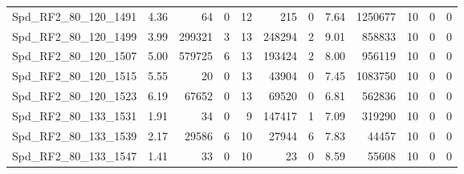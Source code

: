 \begin{longtable}[c]{@{}lrrrrrrrrrrr@{}}
Spd\_RF2\_80\_120\_1491       & 4.36                   & 64                      & 0                       & 12                     & 215                     & 0                       & 7.64                    & 1250677                  & 10                       & 0                        & 0                        \\
Spd\_RF2\_80\_120\_1499       & 3.99                   & 299321                  & 3                       & 13                     & 248294                  & 2                       & 9.01                    & 858833                   & 10                       & 0                        & 0                        \\
Spd\_RF2\_80\_120\_1507       & 5.00                   & 579725                  & 6                       & 13                     & 193424                  & 2                       & 8.00                    & 956119                   & 10                       & 0                        & 0                        \\
Spd\_RF2\_80\_120\_1515       & 5.55                   & 20                      & 0                       & 13                     & 43904                   & 0                       & 7.45                    & 1083750                  & 10                       & 0                        & 0                        \\
Spd\_RF2\_80\_120\_1523       & 6.19                   & 67652                   & 0                       & 13                     & 69520                   & 0                       & 6.81                    & 562836                   & 10                       & 0                        & 0                        \\
Spd\_RF2\_80\_133\_1531       & 1.91                   & 34                      & 0                       & 9                      & 147417                  & 1                       & 7.09                    & 319290                   & 10                       & 0                        & 0                        \\
Spd\_RF2\_80\_133\_1539       & 2.17                   & 29586                   & 6                       & 10                     & 27944                   & 6                       & 7.83                    & 44457                    & 10                       & 0                        & 0                        \\
Spd\_RF2\_80\_133\_1547       & 1.41                   & 33                      & 0                       & 10                     & 23                      & 0                       & 8.59                    & 55608                    & 10                       & 0                        & 0                        \\

\end{longtable}
